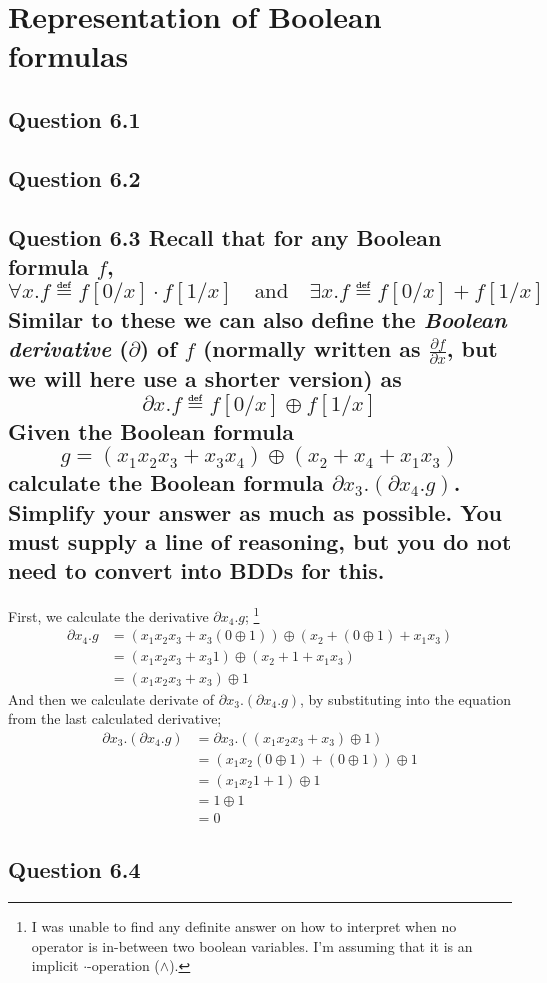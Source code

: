 \section{Representation of Boolean formulas}
\subsection*{Question 6.1}
\subsection*{Question 6.2}
\subsection*{Question 6.3 \mdseries Recall that for any Boolean formula $f$,
\[ \forall x.f \eqdef f[0/x] \cdot f[1/x]
\quad \text{and} \quad
\exists x.f \eqdef f[0/x] + f[1/x] \]
Similar to these we can also define the {\it Boolean derivative} ($\partial$)
of $f$ (normally written as $\frac{\partial f}{\partial x}$, but we will here
use a shorter version) as
\[ \partial x.f \eqdef f[0/x] \oplus f[1/x] \]
Given the Boolean formula
\[ g = (x_1 x_2 x_3 + x_3 x_4) \oplus (x_2 + x_4 + x_1 x_3) \]
calculate the Boolean formula $\partial x_3.(\partial x_4.g)$. Simplify your
answer as much as possible. You must supply a line of reasoning, but you do
not need to convert into BDDs for this.
}

First, we calculate the derivative $\partial x_4.g$; \footnote{I was unable to
find any definite answer on how to interpret when no operator is in-between
two boolean variables. I'm assuming that it is an implicit $\cdot$-operation
($\land$).}
\begin{align*}
	\partial x_4.g &=
	(x_1 x_2 x_3 + x_3 (0 \oplus 1))
	\oplus
	(x_2 + (0 \oplus 1) + x_1 x_3) \\
	&=
	(x_1 x_2 x_3 + x_3 1)
	\oplus
	(x_2 + 1 + x_1 x_3) \\
	&=
	(x_1 x_2 x_3 + x_3)
	\oplus 1
\end{align*}
And then we calculate derivate of $\partial x_3.(\partial x_4.g)$, by
substituting into the equation from the last calculated derivative;
\begin{align*}
	\partial x_3.(\partial x_4.g)
	&= \partial x_3.( (x_1 x_2 x_3 + x_3) \oplus 1 ) \\
	&= (x_1 x_2 (0 \oplus 1) + (0 \oplus 1) ) \oplus 1 \\
	&= (x_1 x_2 1 + 1) \oplus 1 \\
	&= 1 \oplus 1 \\
	&= 0
\end{align*}

\subsection*{Question 6.4}